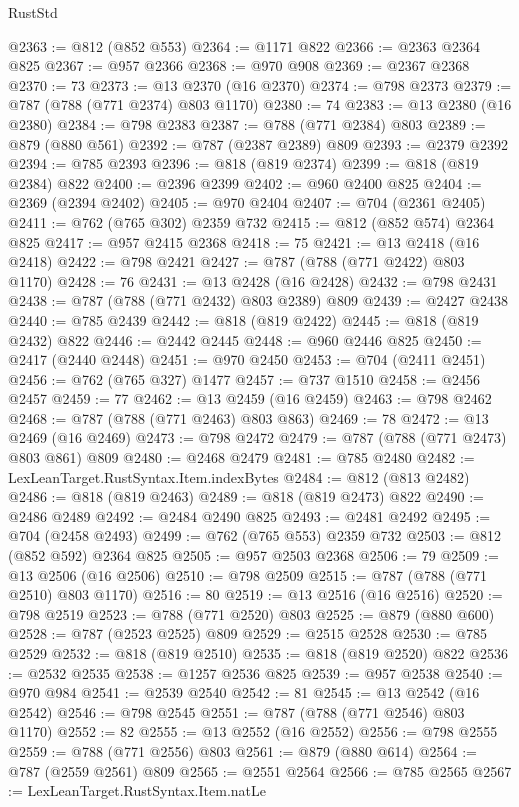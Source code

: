 \begin{lexlean}{RustStd}
\begin{coremodule}
@2363 := @812 (@852 @553)
@2364 := @1171 @822
@2366 := @2363 @2364 @825
@2367 := @957 @2366
@2368 := @970 @908
@2369 := @2367 @2368
@2370 := 73
@2373 := @13 @2370 (@16 @2370)
@2374 := @798 @2373
@2379 := @787 (@788 (@771 @2374) @803 @1170)
@2380 := 74
@2383 := @13 @2380 (@16 @2380)
@2384 := @798 @2383
@2387 := @788 (@771 @2384) @803
@2389 := @879 (@880 @561)
@2392 := @787 (@2387 @2389) @809
@2393 := @2379 @2392
@2394 := @785 @2393
@2396 := @818 (@819 @2374)
@2399 := @818 (@819 @2384) @822
@2400 := @2396 @2399
@2402 := @960 @2400 @825
@2404 := @2369 (@2394 @2402)
@2405 := @970 @2404
@2407 := @704 (@2361 @2405)
@2411 := @762 (@765 @302) @2359 @732
@2415 := @812 (@852 @574) @2364 @825
@2417 := @957 @2415 @2368
@2418 := 75
@2421 := @13 @2418 (@16 @2418)
@2422 := @798 @2421
@2427 := @787 (@788 (@771 @2422) @803 @1170)
@2428 := 76
@2431 := @13 @2428 (@16 @2428)
@2432 := @798 @2431
@2438 := @787 (@788 (@771 @2432) @803 @2389) @809
@2439 := @2427 @2438
@2440 := @785 @2439
@2442 := @818 (@819 @2422)
@2445 := @818 (@819 @2432) @822
@2446 := @2442 @2445
@2448 := @960 @2446 @825
@2450 := @2417 (@2440 @2448)
@2451 := @970 @2450
@2453 := @704 (@2411 @2451)
@2456 := @762 (@765 @327) @1477
@2457 := @737 @1510
@2458 := @2456 @2457
@2459 := 77
@2462 := @13 @2459 (@16 @2459)
@2463 := @798 @2462
@2468 := @787 (@788 (@771 @2463) @803 @863)
@2469 := 78
@2472 := @13 @2469 (@16 @2469)
@2473 := @798 @2472
@2479 := @787 (@788 (@771 @2473) @803 @861) @809
@2480 := @2468 @2479
@2481 := @785 @2480
@2482 := LexLeanTarget.RustSyntax.Item.indexBytes
@2484 := @812 (@813 @2482)
@2486 := @818 (@819 @2463)
@2489 := @818 (@819 @2473) @822
@2490 := @2486 @2489
@2492 := @2484 @2490 @825
@2493 := @2481 @2492
@2495 := @704 (@2458 @2493)
@2499 := @762 (@765 @553) @2359 @732
@2503 := @812 (@852 @592) @2364 @825
@2505 := @957 @2503 @2368
@2506 := 79
@2509 := @13 @2506 (@16 @2506)
@2510 := @798 @2509
@2515 := @787 (@788 (@771 @2510) @803 @1170)
@2516 := 80
@2519 := @13 @2516 (@16 @2516)
@2520 := @798 @2519
@2523 := @788 (@771 @2520) @803
@2525 := @879 (@880 @600)
@2528 := @787 (@2523 @2525) @809
@2529 := @2515 @2528
@2530 := @785 @2529
@2532 := @818 (@819 @2510)
@2535 := @818 (@819 @2520) @822
@2536 := @2532 @2535
@2538 := @1257 @2536 @825
@2539 := @957 @2538
@2540 := @970 @984
@2541 := @2539 @2540
@2542 := 81
@2545 := @13 @2542 (@16 @2542)
@2546 := @798 @2545
@2551 := @787 (@788 (@771 @2546) @803 @1170)
@2552 := 82
@2555 := @13 @2552 (@16 @2552)
@2556 := @798 @2555
@2559 := @788 (@771 @2556) @803
@2561 := @879 (@880 @614)
@2564 := @787 (@2559 @2561) @809
@2565 := @2551 @2564
@2566 := @785 @2565
@2567 := LexLeanTarget.RustSyntax.Item.natLe

\end{coremodule}
\end{lexlean}

